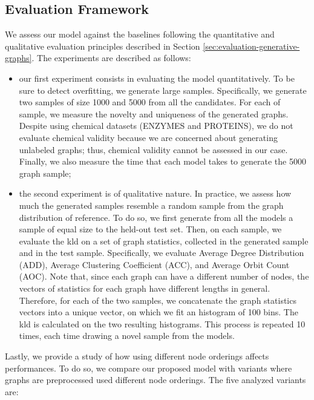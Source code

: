 \subsection{Evaluation Framework}
We assess our model against the baselines following the quantitative and qualitative evaluation principles described in Section \ref{sec:evaluation-generative-graphs}. The experiments are described as follows:
\begin{itemize}
    \item our first experiment consists in evaluating the model quantitatively. To be sure to detect overfitting, we generate large samples. Specifically, we generate two samples of size 1000 and 5000 from all the candidates. For each of sample, we measure the novelty and uniqueness of the generated graphs. Despite using chemical datasets (ENZYMES and PROTEINS), we do not evaluate chemical validity because we are concerned about generating unlabeled graphs; thus, chemical validity cannot be assessed in our case. Finally, we also measure the time that each model takes to generate the 5000 graph sample;
    \item the second experiment is of qualitative nature. In practice, we assess how much the generated samples resemble a random sample from the graph distribution of reference. To do so, we first generate from all the models a sample of equal size to the held-out test set. Then, on each sample, we evaluate the \gls{kld} on a set of graph statistics, collected in the generated sample and in the test sample. Specifically, we evaluate Average Degree Distribution (ADD), Average Clustering Coefficient (ACC), and Average Orbit Count (AOC). Note that, since each graph can have a different number of nodes, the vectors of statistics for each graph have different lengths in general. Therefore, for each of the two samples, we concatenate the graph statistics vectors into a unique vector, on which we fit an histogram of 100 bins. The \gls{kld} is calculated on the two resulting histograms. This process is repeated 10 times, each time drawing a novel sample from the models.
\end{itemize}
Lastly, we provide a study of how using different node orderings affects performances. To do so, we compare our proposed model with variants where graphs are preprocessed used different node orderings. The five analyzed variants are:
